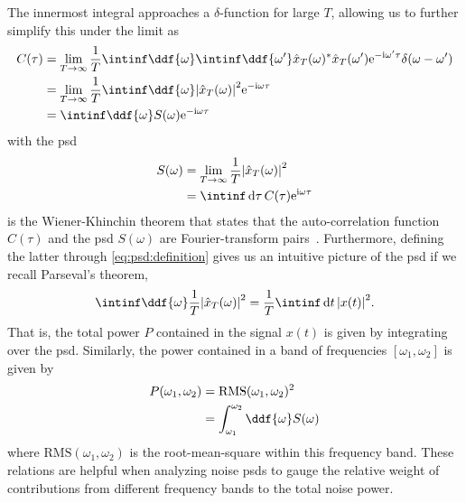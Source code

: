 The innermost integral approaches a $\delta$-function for large $T$,
allowing us to further simplify this under the limit as
\begin{align}
    C(\tau) &= \lim_{T\to\infty} \frac{1}{T}\intinf\ddf{\omega}\intinf\ddf{\omega^\prime}
                \hat{x}_T(\omega)^{\ast}\hat{x}_T(\omega^\prime)
                \e^{-\i\omega^\prime\tau}\delta(\omega - \omega^\prime)\\
            &= \lim_{T\to\infty}\frac{1}{T}
                \intinf\ddf{\omega}\abs{\hat{x}_T(\omega)}^2 \e^{-\i\omega\tau} \\
            &= \intinf\ddf{\omega} S(\omega) \e^{-\i\omega\tau} \label{eq:wiener_khinchin}
\end{align}
with the \gls{psd}
\begin{align}
    S(\omega) &= \lim_{T\to\infty}\frac{1}{T}\abs{\hat{x}_T(\omega)}^2 \label{eq:psd:definition}\\
              &= \intinf\dd{\tau} C(\tau)\e^{\i\omega\tau}
\end{align}
 is the Wiener-Khinchin theorem that states that the auto-correlation function $C(\tau)$ and the \gls{psd} $S(\omega)$ are Fourier-transform pairs~\cite{Koopmans1995}.
Furthermore, defining the latter through \cref{eq:psd:definition} gives us an intuitive picture of the \gls{psd} if we recall Parseval's theorem,
\begin{align}\label{eq:parseval}
    \intinf\ddf{\omega}\frac{1}{T}\abs{\hat{x}_T(\omega)}^2 = \frac{1}{T}\intinf\dd{t}\abs{x(t)}^2.
\end{align}
That is, the total power $P$ contained in the signal $x(t)$ is given by integrating over the \gls{psd}.
Similarly, the power contained in a band of frequencies $[\omega_1, \omega_2]$ is given by
\begin{align}
    P(\omega_1, \omega_2) &= \text{RMS}(\omega_1, \omega_2)^2 \\
                          &= \int_{\omega_1}^{\omega_2}\ddf{\omega} S(\omega) \label{eq:psd:bandpower}
\end{align}
where $\text{RMS}(\omega_1, \omega_2)$ is the root-mean-square within this frequency band.
These relations are helpful when analyzing noise \glspl{psd} to gauge the relative weight of contributions from different frequency bands to the total noise power.

